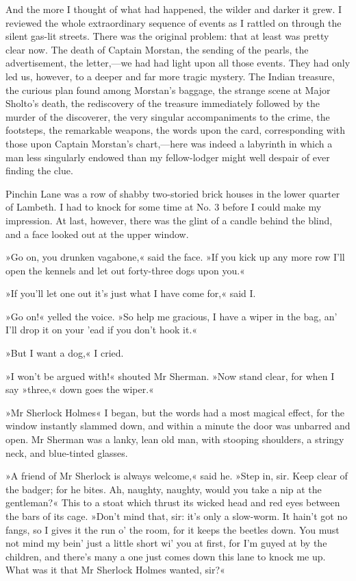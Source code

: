 And the more I thought of what had happened, the wilder and darker it grew. I reviewed the whole extraordinary sequence of events as I rattled on through the silent gas-lit streets. There was the original problem: that at least was pretty clear now. The death of Captain Morstan, the sending of the pearls, the advertisement, the letter,—we had had light upon all those events. They had only led us, however, to a deeper and far more tragic mystery. The Indian treasure, the curious plan found among Morstan's baggage, the strange scene at Major Sholto's death, the rediscovery of the treasure immediately followed by the murder of the discoverer, the very singular accompaniments to the crime, the footsteps, the remarkable weapons, the words upon the card, corresponding with those upon Captain Morstan's chart,—here was indeed a labyrinth in which a man less singularly endowed than my fellow-lodger might well despair of ever finding the clue.

Pinchin Lane was a row of shabby two-storied brick houses in the lower quarter of Lambeth. I had to knock for some time at No. 3 before I could make my impression. At last, however, there was the glint of a candle behind the blind, and a face looked out at the upper window.

»Go on, you drunken vagabone,« said the face. »If you kick up any more row I'll open the kennels and let out forty-three dogs upon you.«

»If you'll let one out it's just what I have come for,« said I.

»Go on!« yelled the voice. »So help me gracious, I have a wiper in the bag, an' I'll drop it on your 'ead if you don't hook it.«

»But I want a dog,« I cried.

»I won't be argued with!« shouted Mr Sherman. »Now stand clear, for when I say »three,« down goes the wiper.«

»Mr Sherlock Holmes\longdash« I began, but the words had a most magical effect, for the window instantly slammed down, and within a minute the door was unbarred and open. Mr Sherman was a lanky, lean old man, with stooping shoulders, a stringy neck, and blue-tinted glasses.

»A friend of Mr Sherlock is always welcome,« said he. »Step in, sir. Keep clear of the badger; for he bites. Ah, naughty, naughty, would you take a nip at the gentleman?« This to a stoat which thrust its wicked head and red eyes between the bars of its cage. »Don't mind that, sir: it's only a slow-worm. It hain't got no fangs, so I gives it the run o' the room, for it keeps the beetles down. You must not mind my bein' just a little short wi' you at first, for I'm guyed at by the children, and there's many a one just comes down this lane to knock me up. What was it that Mr Sherlock Holmes wanted, sir?«

